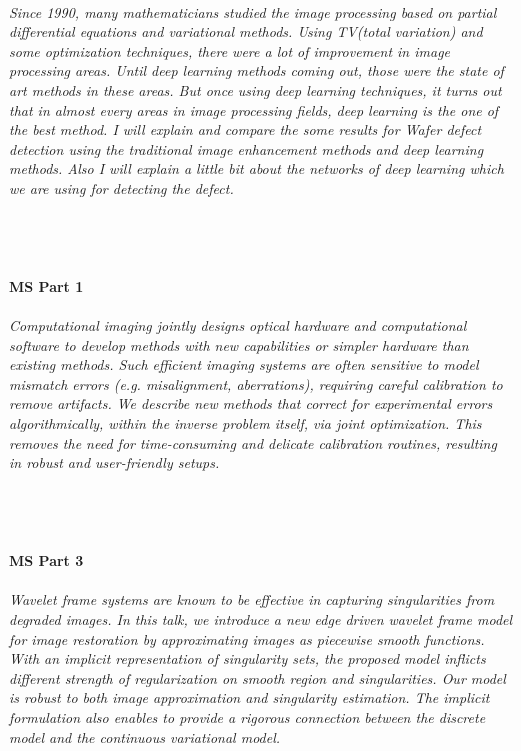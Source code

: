 \begin{multicols}{2}
\\  
    \textit{Since 1990, many mathematicians studied the image processing based on partial differential equations and variational methods. Using TV(total variation) and some optimization techniques, there were a lot of improvement in image processing areas. Until deep learning methods coming out, those were the state of art methods in these areas. But once using deep learning techniques, it turns out that in almost every areas in image processing fields, deep learning is the one of the best method. I will explain and compare the some results for Wafer defect detection using the traditional image enhancement methods and deep learning methods. Also I will explain a little bit about the networks of deep learning which we are using for detecting the defect.}\\
\\ 
    \\
    \\\\
    \noindent\textbf{MS Part 1}\\
\\  
    \textit{Computational imaging jointly designs optical hardware and computational software to develop methods with new capabilities or simpler hardware than existing methods. Such efficient imaging systems are often sensitive to model mismatch errors (e.g. misalignment, aberrations), requiring careful calibration to remove artifacts. We describe new methods that correct for experimental errors algorithmically, within the inverse problem itself, via joint optimization. This removes the need for time-consuming and delicate calibration routines, resulting in robust and user-friendly setups.}\\
\\ 
    \\
    \\\\
    \noindent\textbf{MS Part 3}\\
\\  
    \textit{Wavelet frame systems are known to be effective in capturing singularities from degraded images. In this talk, we introduce a new edge driven wavelet frame model for image restoration by approximating images as piecewise smooth functions. With an implicit representation of singularity sets, the proposed model inflicts different strength of regularization on smooth region and singularities. Our model is robust to both image approximation and singularity estimation. The implicit formulation also enables to provide a rigorous connection between the discrete model and the continuous variational model.}\\

\end{multicols}
